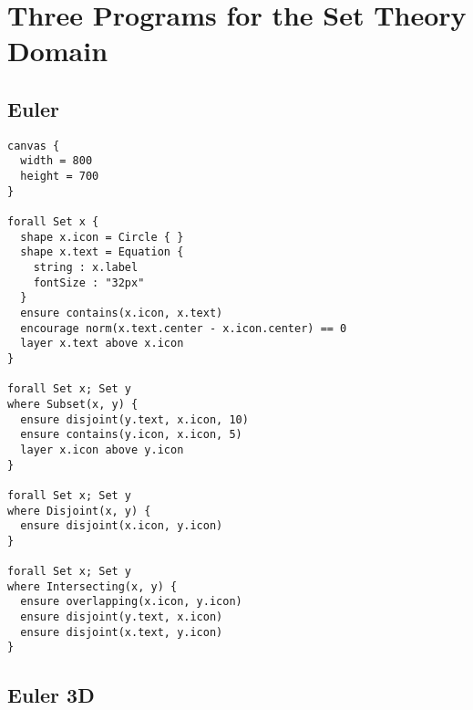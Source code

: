\chapter{Three \Style Programs for the \Penrose Set Theory Domain}
\label{app:set-styles}

\section{Euler}

\begin{center}
\begin{mdframed}[style=STYCode]
\begin{lstlisting}[language=Sty-Sets-new,escapechar=@]
canvas {
  width = 800
  height = 700
}

forall Set x {
  shape x.icon = Circle { }
  shape x.text = Equation {
    string : x.label
    fontSize : "32px"
  }
  ensure contains(x.icon, x.text)
  encourage norm(x.text.center - x.icon.center) == 0
  layer x.text above x.icon
}

forall Set x; Set y
where Subset(x, y) {
  ensure disjoint(y.text, x.icon, 10)
  ensure contains(y.icon, x.icon, 5)
  layer x.icon above y.icon
}

forall Set x; Set y
where Disjoint(x, y) {
  ensure disjoint(x.icon, y.icon)
}

forall Set x; Set y
where Intersecting(x, y) {
  ensure overlapping(x.icon, y.icon)
  ensure disjoint(y.text, x.icon)
  ensure disjoint(x.text, y.icon)
}
\end{lstlisting}
\end{mdframed}
\end{center}

\section{Euler 3D}

